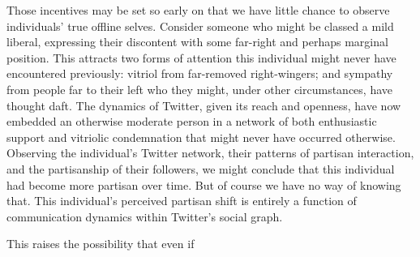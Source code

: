 \documentclass{article}
\begin{document}
Those incentives may be set so early on that we have
little chance to observe individuals' true offline selves. 
Consider someone who might be classed a mild liberal, expressing their discontent
with some far-right and perhaps marginal position. This attracts two
forms of attention this individual might never have encountered
previously: vitriol from far-removed right-wingers; and sympathy
from people far to their left who they might, under other
circumstances, have thought daft. The dynamics of Twitter, given its
reach and openness, have now embedded an otherwise moderate person
in a network of both enthusiastic support and vitriolic condemnation
that might never have occurred otherwise. Observing the individual's
Twitter network, their patterns of partisan interaction, and the
partisanship of their followers, we might conclude that this
individual had become more partisan over time. But of course we have
no way of knowing that. This individual's perceived partisan shift is
entirely a function of communication dynamics within Twitter's social
graph. 

This raises the possibility that even if 


\end{document}

